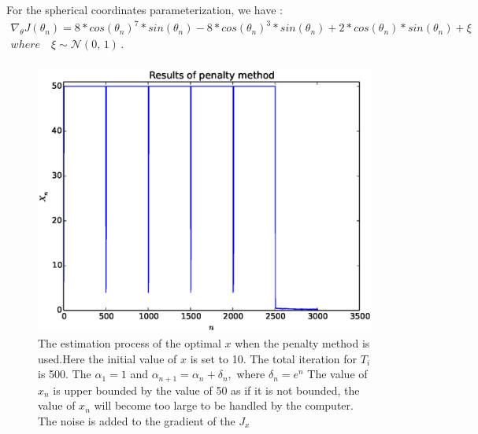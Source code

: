 \documentclass[a4paper,12pt]{article}
\begin{document}
For the spherical coordinates parameterization, we have :\\

\begin{equation}\label{eq:sphe_poly_noise}
\begin{aligned}
\nabla _{\theta} J(\theta_n) = 8*cos(\theta_n)^7*sin(\theta_n)-8*cos(\theta_n)^3*sin(\theta_n)+2*cos(\theta_n)*sin(\theta_n)+\xi\\
where \quad \xi \sim \mathcal{N}(0,\,1)\,.\\
\end{aligned}
\end{equation}
\begin{figure}[H]
\begin{center}
\includegraphics[width=1.0\linewidth]{polynomial_est_noise.eps}


\end{center}
   \caption{The estimation process of the optimal $x$ when the penalty method is used.Here the initial value of $x$ is set to 10. The total iteration for $T_i$ is 500. The $\alpha_1 = 1$ and $\alpha _{n+1} = \alpha _n + \delta_n,$ where $\delta _ n=e^n$ The value of $x_n$ is upper bounded by the value of 50 as if it is not bounded, the value of $x_n$ will become too large to be handled by the computer. The noise is added to the gradient of the $J_{x}$  }
\label{fig:poly_result_noise}
\end{figure}
\end{document}
